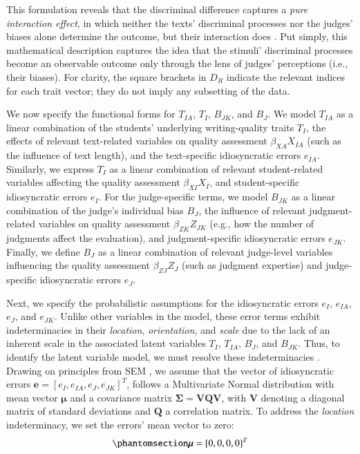 \documentclass[
  authoryear,
  review,
  1p]{elsarticle}
\begin{document}
This formulation reveals that the discriminal difference captures a
\emph{pure interaction effect}, in which neither the texts' discriminal
processes nor the judges' biases alone determine the outcome, but their
interaction does \citep{Attia_et_al_2022}. Put simply, this mathematical
description captures the idea that the stimuli' discriminal processes
become an observable outcome only through the lens of judges'
perceptions (i.e., their biases). For clarity, the square brackets in
\(D_{R}\) indicate the relevant indices for each trait vector; they do
not imply any subsetting of the data.

We now specify the functional forms for \(T_{IA}\), \(T_{I}\),
\(B_{JK}\), and \(B_{J}\). We model \(T_{IA}\) as a linear combination
of the students' underlying writing-quality traits \(T_{I}\), the
effects of relevant text-related variables on quality assessment
\(\beta_{XA}X_{IA}\) (such as the influence of text length), and the
text-specific idiosyncratic errors \(e_{IA}\). Similarly, we express
\(T_{I}\) as a linear combination of relevant student-related variables
affecting the quality assessment \(\beta_{XI} X_{I}\), and
student-specific idiosyncratic errors \(e_{I}\). For the judge-specific
terms, we model \(B_{JK}\) as a linear combination of the judge's
individual bias \(B_{J}\), the influence of relevant judgment-related
variables on quality assessment \(\beta_{ZK}Z_{JK}\) (e.g., how the
number of judgments affect the evaluation), and judgment-specific
idiosyncratic errors \(e_{JK}\). Finally, we define \(B_{J}\) as a
linear combination of relevant judge-level variables influencing the
quality assessment \(\beta_{ZJ}Z_{J}\) (such as judgment expertise) and
judge-specific idiosyncratic errors \(e_{J}\).

Next, we specify the probabilistic assumptions for the idiosyncratic
errors \(e_{I}\), \(e_{IA}\), \(e_{J}\), and \(e_{JK}\). Unlike other
variables in the model, these error terms exhibit indeterminacies in
their \emph{location}, \emph{orientation}, and \emph{scale} due to the
lack of an inherent scale in the associated latent variables \(T_{I}\),
\(T_{IA}\), \(B_{J}\), and \(B_{JK}\). Thus, to identify the latent
variable model, we must resolve these indeterminacies
\citep{Depaoli_2021, deAyala_2009}. Drawing on principles from SEM
\citep{Hoyle_et_al_2023}, we assume that the vector of idiosyncratic
errors \(\boldsymbol{e} = [e_{I}, e_{IA}, e_{J}, e_{JK}]^{T}\), follows
a Multivariate Normal distribution with mean vector \(\boldsymbol{\mu}\)
and a covariance matrix
\(\boldsymbol{\Sigma} = \boldsymbol{V} \boldsymbol{Q} \boldsymbol{V}\),
with \(\boldsymbol{V}\) denoting a diagonal matrix of standard
deviations and \(\boldsymbol{Q}\) a correlation matrix. To address the
\emph{location} indeterminacy, we set the errors' mean vector to zero:
\begin{equation}\phantomsection\label{eq-mat53}{
\boldsymbol{\mu} = [0, 0, 0, 0]^{T}
}\end{equation}
\end{document}
